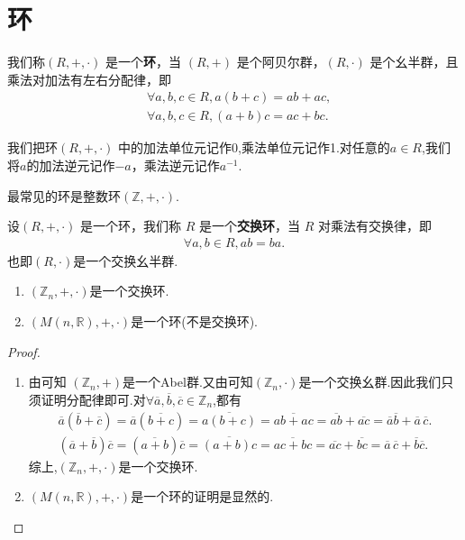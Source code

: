 \documentclass[../../main.tex]{subfiles}
\begin{document}
\section{环}

\begin{definition}[环]
我们称$(R, +, \cdot)$ 是一个\textbf{环}，当 $(R, +)$ 是个阿贝尔群，$(R, \cdot)$ 是个幺半群，且乘法对加法有左右分配律，即
\begin{align*}
&\forall a,b,c\in R, a(b + c)=ab + ac ,\\
&\forall a,b,c\in R, (a + b)c=ac + bc .
\end{align*} 
\end{definition}
\begin{remark}
我们把环$(R, +, \cdot)$ 中的加法单位元记作0,乘法单位元记作1.对任意的$a\in R$,我们将$a$的加法逆元记作$-a$，乘法逆元记作$a^{-1}$.
\end{remark}
\begin{note}
最常见的环是整数环$(\mathbb{Z},+,\cdot)$.
\end{note}

\begin{definition}[交换环]
设$(R, +, \cdot)$ 是一个环，我们称 $R$ 是一个\textbf{交换环}，当 $R$ 对乘法有交换律，即
\begin{align*}
\forall a,b\in R, ab = ba.
\end{align*}
也即$(R,\cdot)$是一个交换幺半群.
\end{definition}

\begin{example}
\begin{enumerate}
\item $(\mathbb{Z}_n,+,\cdot)$是一个交换环.

\item $(M(n,\mathbb{R}),+,\cdot)$是一个环(不是交换环).
\end{enumerate}
\end{example}
\begin{proof}
\begin{enumerate}
\item 由可知 $(\mathbb{Z}_n,+)$是一个Abel群.又由可知$(\mathbb{Z}_n,\cdot)$是一个交换幺群.因此我们只须证明分配律即可.对$\forall \overline{a},\overline{b},\overline{c}\in \mathbb{Z} _n$,都有
\begin{gather*}
\overline{a}\left( \overline{b}+\overline{c} \right) =\overline{a}\left( \overline{b+c} \right) =\overline{a\left( b+c \right) }=\overline{ab+ac}=\overline{ab}+\overline{ac}=\overline{a}\overline{b}+\overline{a}\,\overline{c}.
\\
\left( \overline{a}+\overline{b} \right) \overline{c}=\left( \overline{a+b} \right) \overline{c}=\overline{\left( a+b \right) c}=\overline{ac+bc}=\overline{ac}+\overline{bc}=\overline{a}\,\overline{c}+\overline{b}\overline{c}.
\end{gather*}
综上,$(\mathbb{Z}_n,+,\cdot)$是一个交换环.

\item $(M(n,\mathbb{R}),+,\cdot)$是一个环的证明是显然的.
\end{enumerate}

\end{proof}
\end{document}
